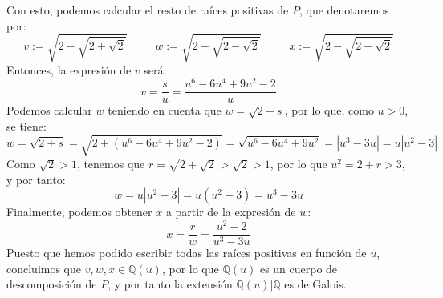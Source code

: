 Con esto, podemos calcular el resto de raíces positivas de $P$, que denotaremos por:
$$
v := \sqrt{2-\sqrt{2+\sqrt{2}}} \hspace{30pt}
w := \sqrt{2+\sqrt{2-\sqrt{2}}} \hspace{30pt}
x := \sqrt{2-\sqrt{2-\sqrt{2}}}
$$
Entonces, la expresión de $v$ será:
$$ v = \frac{s}{u} = \frac{u^6-6u^4+9u^2-2}{u} $$
Podemos calcular $w$ teniendo en cuenta que $w=\sqrt{2+s}$, por lo que, como $u > 0$, se tiene:
$$ w = \sqrt{2+s} = \sqrt{2+\left(u^6-6u^4+9u^2-2\right)} = \sqrt{u^6-6u^4+9u^2} = \left| u^3-3u\right| = u \left| u^2-3\right|$$
Como $\sqrt{2}>1$, tenemos que $r=\sqrt{2+\sqrt{2}}>\sqrt{2}>1$, por lo que $u^2 = 2+r > 3$, y por tanto:
$$ w = u \left| u^2-3\right| = u \left(u^2-3\right) = u^3-3u $$
Finalmente, podemos obtener $x$ a partir de la expresión de $w$:
$$ x = \frac{r}{w} = \frac{u^2-2}{u^3-3u}
$$
Puesto que hemos podido escribir todas las raíces positivas en función de $u$, concluimos que $v,w,x \in \mathbb{Q}(u)$, por lo que $\mathbb{Q}(u)$ es un cuerpo de descomposición de $P$, y por tanto la extensión $\mathbb{Q}(u)|\mathbb{Q}$ es de Galois.

